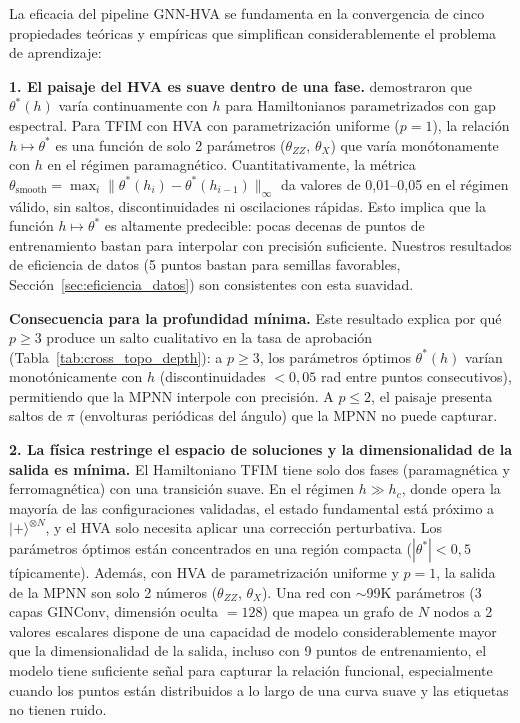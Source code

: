 \documentclass[11pt,a4paper,spanish]{book}
\begin{document}
La eficacia del pipeline GNN-HVA se fundamenta en la convergencia de cinco propiedades teóricas y empíricas que simplifican considerablemente el problema de aprendizaje:

\textbf{1. El paisaje del HVA es suave dentro de una fase.} \citet{mele2022} demostraron que $\theta^*(h)$ varía continuamente con $h$ para Hamiltonianos parametrizados con gap espectral. Para TFIM con HVA con parametrización uniforme ($p = 1$), la relación $h \mapsto \theta^*$ es una función de solo 2 parámetros ($\theta_{ZZ}$, $\theta_X$) que varía monótonamente con $h$ en el régimen paramagnético. Cuantitativamente, la métrica $\theta_{\text{smooth}} = \max_i \|\theta^*(h_i) - \theta^*(h_{i-1})\|_\infty$ da valores de 0,01--0,05 en el régimen válido, sin saltos, discontinuidades ni oscilaciones rápidas. Esto implica que la función $h \mapsto \theta^*$ es altamente predecible: pocas decenas de puntos de entrenamiento bastan para interpolar con precisión suficiente. Nuestros resultados de eficiencia de datos (5 puntos bastan para semillas favorables, Sección~\ref{sec:eficiencia_datos}) son consistentes con esta suavidad.

\textbf{Consecuencia para la profundidad mínima.} Este resultado explica por qué $p \geq 3$ produce un salto cualitativo en la tasa de aprobación (Tabla~\ref{tab:cross_topo_depth}): a $p \geq 3$, los parámetros óptimos $\theta^*(h)$ varían monotónicamente con $h$ (discontinuidades $< 0,05$ rad entre puntos consecutivos), permitiendo que la MPNN interpole con precisión. A $p \leq 2$, el paisaje presenta saltos de $\pi$ (envolturas periódicas del ángulo) que la MPNN no puede capturar.

\textbf{2. La física restringe el espacio de soluciones y la dimensionalidad de la salida es mínima.} El Hamiltoniano TFIM tiene solo dos fases (paramagnética y ferromagnética) con una transición suave. En el régimen $h \gg h_c$, donde opera la mayoría de las configuraciones validadas, el estado fundamental está próximo a $|+\rangle^{\otimes N}$, y el HVA solo necesita aplicar una corrección perturbativa. Los parámetros óptimos están concentrados en una región compacta ($|\theta^*| < 0,5$ típicamente). Además, con HVA de parametrización uniforme y $p = 1$, la salida de la MPNN son solo 2 números ($\theta_{ZZ}$, $\theta_X$). Una red con $\sim$99K parámetros (3 capas GINConv, dimensión oculta $= 128$) que mapea un grafo de $N$ nodos a 2 valores escalares dispone de una capacidad de modelo considerablemente mayor que la dimensionalidad de la salida, incluso con 9 puntos de entrenamiento, el modelo tiene suficiente señal para capturar la relación funcional, especialmente cuando los puntos están distribuidos a lo largo de una curva suave y las etiquetas no tienen ruido.
\end{document}
